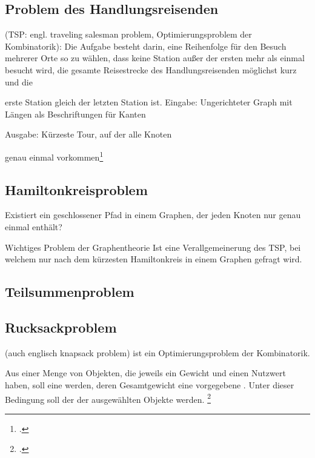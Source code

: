 \documentclass{lehramt-informatik-haupt}
\begin{document}
\subsection{Problem des Handlungsreisenden}

(TSP: engl. traveling salesman problem, Optimierungsproblem der
Kombinatorik): Die Aufgabe besteht darin, eine Reihenfolge für den
Besuch mehrerer Orte so zu wählen, dass keine Station außer der ersten
mehr als einmal besucht wird, die gesamte Reisestrecke des
Handlungsreisenden möglichst kurz und die

erste Station gleich der letzten Station ist. Eingabe: Ungerichteter
Graph mit Längen als Beschriftungen für Kanten

Ausgabe: Kürzeste Tour, auf der alle Knoten

genau einmal vorkommen\footcite[Seite 73]{theo:fs:4}

%

\subsection{Hamiltonkreisproblem}

Existiert ein geschlossener Pfad in einem Graphen, der jeden Knoten nur
genau einmal enthält?

Wichtiges Problem der Graphentheorie Ist eine Verallgemeinerung des TSP,
bei welchem nur nach dem kürzesten Hamiltonkreis in einem Graphen
gefragt wird.

%

\subsection{Teilsummenproblem}

\liProblemSubsetSum

%

\subsection{Rucksackproblem}

(auch englisch knapsack problem) ist ein Optimierungsproblem der
Kombinatorik.

Aus einer Menge von Objekten, die jeweils ein Gewicht und einen Nutzwert
haben, soll eine  werden, deren
Gesamtgewicht eine vorgegebene . Unter dieser Bedingung soll der  der
ausgewählten Objekte  werden.
\footcite[Seite 75]{theo:fs:4}
\end{document}
